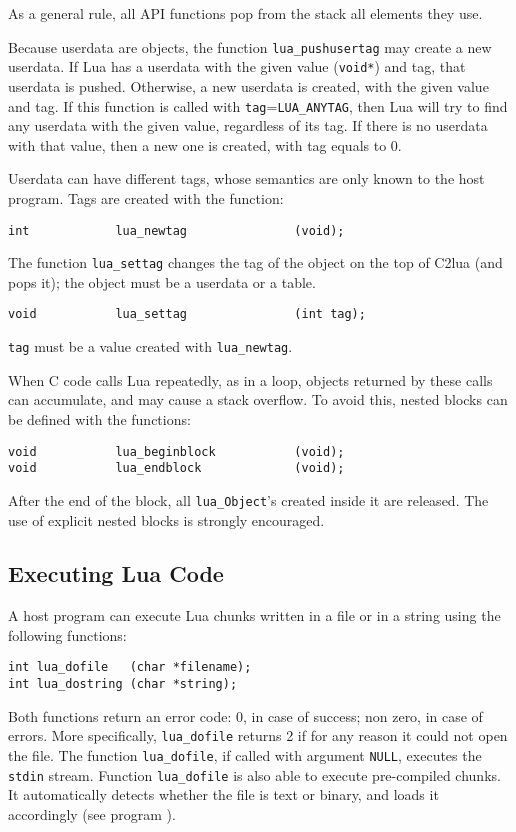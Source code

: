 As a general rule, all API functions pop from the stack
all elements they use.

Because userdata are objects,
the function \verb|lua_pushusertag| may create a new userdata.
If Lua has a userdata with the given value (\verb|void*|) and tag,
that userdata is pushed.
Otherwise, a new userdata is created, with the given value and tag.
If this function is called with
\verb|tag|=\verb|LUA_ANYTAG|,
then Lua will try to find any userdata with the given value,
regardless of its tag.
If there is no userdata with that value, then a new one is created,
with tag equals to 0.

Userdata can have different tags,
whose semantics are only known to the host program.
Tags are created with the function:
\begin{verbatim}
int            lua_newtag               (void);
\end{verbatim}
The function \verb|lua_settag| changes the tag of
the object on the top of C2lua (and pops it);
the object must be a userdata or a table.
\begin{verbatim}
void           lua_settag               (int tag);
\end{verbatim}
\verb|tag| must be a value created with \verb|lua_newtag|.

When C code calls Lua repeatedly, as in a loop,
objects returned by these calls can accumulate,
and may cause a stack overflow.
To avoid this,
nested blocks can be defined with the functions:
\begin{verbatim}
void           lua_beginblock           (void);
void           lua_endblock             (void);
\end{verbatim}
After the end of the block,
all \verb|lua_Object|'s created inside it are released.
The use of explicit nested blocks is strongly encouraged.

\subsection{Executing Lua Code}
A host program can execute Lua chunks written in a file or in a string
using the following functions:
\begin{verbatim}
int lua_dofile   (char *filename);
int lua_dostring (char *string);
\end{verbatim}
Both functions return an error code:
0, in case of success; non zero, in case of errors.
More specifically, \verb|lua_dofile| returns 2 if for any reason
it could not open the file.
The function \verb|lua_dofile|, if called with argument \verb|NULL|,
executes the \verb|stdin| stream.
Function \verb|lua_dofile| is also able to execute pre-compiled chunks.
It automatically detects whether the file is text or binary,
and loads it accordingly (see program ).

